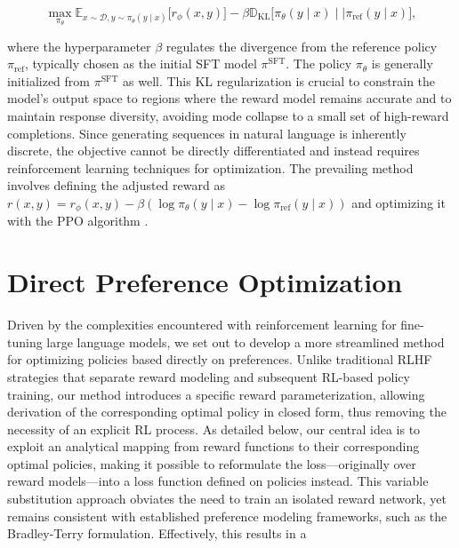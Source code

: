 \begin{equation}\label{eq:RL}
\max_{\pi_{\theta}}  \mathbb{E}_{x\sim \mathcal{D}, y\sim \pi_{\theta}(y \mid x)}\bigl[r_{\phi}(x, y)\bigr] - \beta\mathbb{D}_{\textrm{KL}}\bigl[\pi_{\theta}(y\mid x)\mid \mid \pi_\text{ref}(y\mid x)\bigr],
\end{equation}

where the hyperparameter $\beta$ regulates the divergence from the reference policy $\pi_\text{ref}$, typically chosen as the initial SFT model $\pi^\text{SFT}$. The policy $\pi_\theta$ is generally initialized from $\pi^\text{SFT}$ as well. This KL regularization is crucial to constrain the model's output space to regions where the reward model remains accurate and to maintain response diversity, avoiding mode collapse to a small set of high-reward completions. Since generating sequences in natural language is inherently discrete, the objective cannot be directly differentiated and instead requires reinforcement learning techniques for optimization. The prevailing method \citep{ziegler2020finetuning, stiennon2022learning, bai2022training, ouyang2022training} involves defining the adjusted reward as ${r(x, y) = r_{\phi}(x, y) -\beta (\log \pi_{\theta}(y\mid x) - \log \pi_\text{ref}(y\mid x))}$ and optimizing it with the PPO algorithm \cite{schulman2017proximal}.

\section{Direct Preference Optimization}\label{sec:DPO}

Driven by the complexities encountered with reinforcement learning for fine-tuning large language models, we set out to develop a more streamlined method for optimizing policies based directly on preferences. Unlike traditional RLHF strategies that separate reward modeling and subsequent RL-based policy training, our method introduces a specific reward parameterization, allowing derivation of the corresponding optimal policy in closed form, thus removing the necessity of an explicit RL process. As detailed below, our central idea is to exploit an analytical mapping from reward functions to their corresponding optimal policies, making it possible to reformulate the loss—originally over reward models—into a loss function defined on policies instead. This variable substitution approach obviates the need to train an isolated reward network, yet remains consistent with established preference modeling frameworks, such as the Bradley-Terry formulation. Effectively, this results in a

